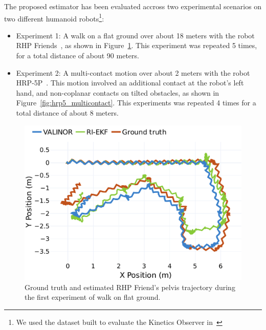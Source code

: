 \documentclass{IJCAS}
\begin{document}
The proposed estimator has been evaluated accross two experimental scenarios on two different humanoid robots\footnote{We used the dataset built to evaluate the Kinetics Observer in~\cite{Demont2024KineticsObserver}}:
\begin{itemize}
    \item Experiment 1: A walk on a flat ground over about 18 meters with the robot RHP Friends~\cite{Benallegue2025RhpFriendsJRL}, as shown in Figure~\ref{fig:trajRhps1_3d}. This experiment was repeated 5 times, for a total distance of about 90 meters.
    \item Experiment 2: A multi-contact motion over about 2 meters with the robot HRP-5P~\cite{Kaneko2019Hrp5}. This motion involved an additional contact at the robot's left hand, and non-coplanar contacts on tilted obstacles, as shown in Figure~\ref{fig:hrp5_multicontact}. This experiments was repeated 4 times for a total distance of about 8 meters.
\end{itemize}


\begin{figure}[!t]
\begin{center}
\includegraphics[width=\columnwidth]{Uploaded/Images/trajectory_rhps1.pdf} 
\vskip -0.5pc
\caption{Ground truth and estimated RHP Friend's pelvis trajectory during the first experiment of walk on flat ground.}\label{fig:trajRhps1_3d}
\end{center}
\vskip -1.5pc
\end{figure}
\end{document}
